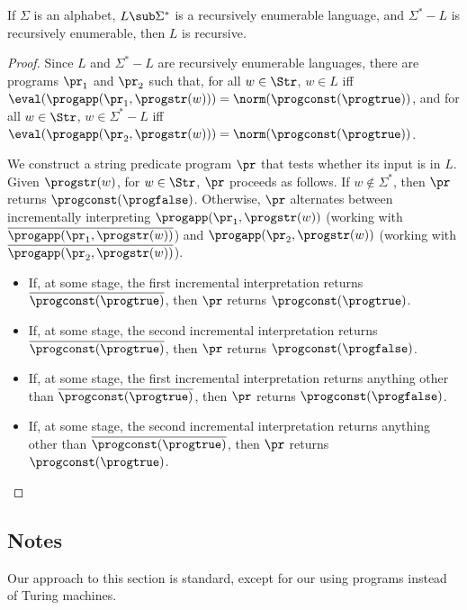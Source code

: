 \begin{theorem}
If $\Sigma$ is an alphabet, $L\sub\Sigma^*$ is a recursively
enumerable language, and $\Sigma^*-L$ is recursively enumerable, then
$L$ is recursive.
\end{theorem}

\begin{proof}
Since $L$ and $\Sigma^*-L$ are recursively enumerable languages,
there are programs $\pr_1$ and $\pr_2$ such that, for all $w\in\Str$,
$w\in L$ iff
$\eval(\progapp(\pr_1,\progstr(w)))=\norm(\progconst(\progtrue))$, and
for all $w\in\Str$, $w\in\Sigma^*-L$ iff
$\eval(\progapp(\pr_2,\progstr(w)))=\norm(\progconst(\progtrue))$.

We construct a string predicate program $\pr$ that tests whether its
input is in $L$.  Given $\progstr(w)$, for $w\in\Str$, $\pr$ proceeds
as follows.  If $w\not\in\Sigma^*$, then $\pr$ returns
$\progconst(\progfalse)$.  Otherwise, $\pr$ alternates between
incrementally interpreting $\progapp(\pr_1,\progstr(w))$ (working with
$\overline{\progapp(\pr_1,\progstr(w))}$) and
$\progapp(\pr_2,\progstr(w))$ (working with
$\overline{\progapp(\pr_2,\progstr(w))}$).

\begin{itemize}
\item If, at some stage, the first incremental interpretation returns
  $\overline{\progconst(\progtrue)}$, then $\pr$ returns
  $\progconst(\progtrue)$.

\item If, at some stage, the second incremental interpretation returns
  $\overline{\progconst(\progtrue)}$, then $\pr$ returns
  $\progconst(\progfalse)$.

\item If, at some stage, the first incremental interpretation returns
  anything other than $\overline{\progconst(\progtrue)}$, then $\pr$
  returns $\progconst(\progfalse)$.

\item If, at some stage, the second incremental interpretation returns
  anything other than $\overline{\progconst(\progtrue)}$, then $\pr$
  returns $\progconst(\progtrue)$.
\end{itemize}
\end{proof}

\subsection{Notes}

Our approach to this section is standard, except for our using
programs instead of Turing machines.

